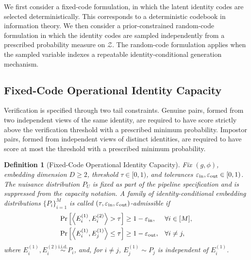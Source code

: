 \documentclass[journal]{IEEEtran}
\newtheorem{definition}[theorem]{Definition}
\begin{document}
\begin{bibunit}
 
We first consider a fixed-code formulation, in which the latent identity codes are selected deterministically. This corresponds to a deterministic codebook in information theory. We then consider a prior-constrained random-code formulation in which the identity codes are sampled independently from a prescribed probability measure on $\mathcal Z$. The random-code formulation applies when the sampled variable indexes a repeatable identity-conditional generation mechanism.








\subsection{Fixed-Code Operational Identity Capacity}
\label{subsec:fixed-code-operational_capacity}

Verification is specified through two tail constraints. Genuine pairs, formed from two independent views of the same identity, are required to have score strictly above the verification threshold with a prescribed minimum probability. Impostor pairs, formed from independent views of distinct identities, are required to have score at most the threshold with a prescribed minimum probability.

\begin{definition}[Fixed-Code Operational Identity Capacity]
\label{def:operational_capacity_main}
%
Fix $(g,\phi)$, embedding dimension $D\ge2$, threshold $\tau\in[0,1)$, and tolerances $\varepsilon_{\rm in},\varepsilon_{\rm out}\in[0,1)$. The nuisance distribution $P_U$ is fixed as part of the pipeline specification and is suppressed from the capacity notation. A family of identity-conditional embedding distributions $\{P_i\}_{i=1}^M$ is called \textit{$(\tau,\varepsilon_{\rm in},\varepsilon_{\rm out})$-admissible} if
%
\begin{subequations}
\begin{align}
\Pr \left[\left\langle E_i^{(1)},E_i^{(2)} \right\rangle > \tau \right] &\ge 1-\varepsilon_{\rm in},
&&\forall i\in[M],
\label{eq:admissible_intra_main}
\\
\Pr \left[\left\langle E_i^{(1)},E_j^{(1)} \right\rangle \le \tau \right] &\ge 1-\varepsilon_{\rm out},
&&\forall i\ne j,
\label{eq:admissible_inter_main}
\end{align}
\end{subequations}
%
where $E_i^{(1)},E_i^{(2)}\stackrel{\mathrm{i.i.d.}}{\sim}P_i$, and, for $i\ne j$, $E_j^{(1)}\sim P_j$ is independent of $E_i^{(1)}$.



\end{definition}
\end{bibunit}
\end{document}
